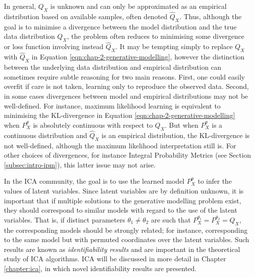 In general, $Q_X$ is unknown and can only be approximated as an empirical distribution based on available samples, often denoted $\widehat{Q}_X$. 
Thus, although the goal is to minimise a divergence between the model distribution and the true data distribution $Q_X$, the problem often reduces to minimising some divergence or loss function involving instead $\widehat{Q}_X$.
It may be tempting simply to replace $Q_X$ with $\widehat{Q}_X$ in Equation \ref{eqn:chap-2-generative-modelling}, however the distinction between the underlying data distribution and empirical distribution can sometimes require subtle reasoning for two main reasons.
First, one could easily overfit if care is not taken, learning only to reproduce the observed data. 
Second, in some cases divergences between model and empirical distributions may not be well-defined. 
For instance, maximum likelihood learning is equivalent to minimising the KL-divergence in Equation \ref{eqn:chap-2-generative-modelling} when $P_X^\theta$ is absolutely continuous with respect to $Q_X$. 
But when $P_X^\theta$ is a continuous distribution and $\widehat{Q}_X$ is an empirical distribution, the KL-divergence is not well-defined, although the maximum likelihood interpretation still is.
For other choices of divergences, for instance Integral Probability Metrics (see Section \ref{subsec:intro-ipm}), this latter issue may not arise. 


In the ICA community, the goal is to use the learned model $P_X^\theta$ to infer the values of latent variables. 
Since latent variables are by definition unknown, it is important that if multiple solutions to the generative modelling problem exist, they should correspond to similar models with regard to the use of the latent variables.
That is, if distinct parameters $\theta_1 \not= \theta_2$ are such that  $P_X^{\theta_1} = P_X^{\theta_2} = Q_X$, the corresponding models should be strongly related; for instance, corresponding to the same model but with permuted coordinates over the latent variables.
Such results are known as \emph{identifiability results} and are important in the theoretical study of ICA algorithms. 
ICA will be discussed in more detail in Chapter \ref{chapter:ica}, in which novel identifiability results are presented.



